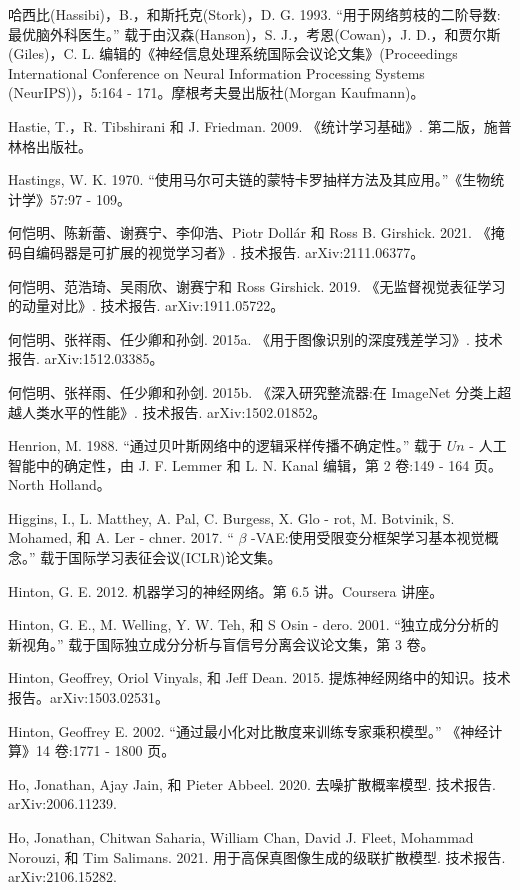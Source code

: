 \documentclass[10pt]{report}
\begin{document}
哈西比(Hassibi)，B.，和斯托克(Stork)，D. G. 1993. “用于网络剪枝的二阶导数:最优脑外科医生。” 载于由汉森(Hanson)，S. J.，考恩(Cowan)，J. D.，和贾尔斯(Giles)，C. L. 编辑的《神经信息处理系统国际会议论文集》(Proceedings International Conference on Neural Information Processing Systems (NeurIPS))，5:164 - 171。摩根考夫曼出版社(Morgan Kaufmann)。

Hastie, T.，R. Tibshirani 和 J. Friedman. 2009. 《统计学习基础》. 第二版，施普林格出版社。

Hastings, W. K. 1970. “使用马尔可夫链的蒙特卡罗抽样方法及其应用。”《生物统计学》57:97 - 109。

何恺明、陈新蕾、谢赛宁、李仰浩、Piotr Dollár 和 Ross B. Girshick. 2021. 《掩码自编码器是可扩展的视觉学习者》. 技术报告. arXiv:2111.06377。

何恺明、范浩琦、吴雨欣、谢赛宁和 Ross Girshick. 2019. 《无监督视觉表征学习的动量对比》. 技术报告. arXiv:1911.05722。

何恺明、张祥雨、任少卿和孙剑. 2015a. 《用于图像识别的深度残差学习》. 技术报告. arXiv:1512.03385。

何恺明、张祥雨、任少卿和孙剑. 2015b. 《深入研究整流器:在 ImageNet 分类上超越人类水平的性能》. 技术报告. arXiv:1502.01852。

Henrion, M. 1988. “通过贝叶斯网络中的逻辑采样传播不确定性。” 载于 \({Un}\) - 人工智能中的确定性，由 J. F. Lemmer 和 L. N. Kanal 编辑，第 2 卷:149 - 164 页。North Holland。

Higgins, I., L. Matthey, A. Pal, C. Burgess, X. Glo - rot, M. Botvinik, S. Mohamed, 和 A. Ler - chner. 2017. “ \(\beta\) -VAE:使用受限变分框架学习基本视觉概念。” 载于国际学习表征会议(ICLR)论文集。

Hinton, G. E. 2012. 机器学习的神经网络。第 6.5 讲。Coursera 讲座。

Hinton, G. E., M. Welling, Y. W. Teh, 和 S Osin - dero. 2001. “独立成分分析的新视角。” 载于国际独立成分分析与盲信号分离会议论文集，第 3 卷。

Hinton, Geoffrey, Oriol Vinyals, 和 Jeff Dean. 2015. 提炼神经网络中的知识。技术报告。arXiv:1503.02531。

Hinton, Geoffrey E. 2002. “通过最小化对比散度来训练专家乘积模型。” 《神经计算》14 卷:1771 - 1800 页。

Ho, Jonathan, Ajay Jain, 和 Pieter Abbeel. 2020. 去噪扩散概率模型. 技术报告. arXiv:2006.11239.

Ho, Jonathan, Chitwan Saharia, William Chan, David J. Fleet, Mohammad Norouzi, 和 Tim Salimans. 2021. 用于高保真图像生成的级联扩散模型. 技术报告. arXiv:2106.15282.
\end{document}
